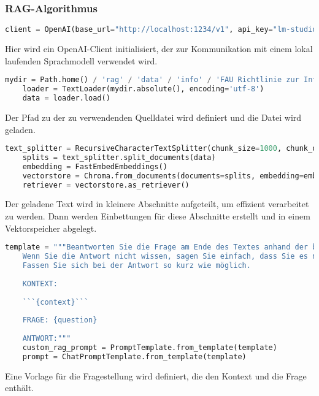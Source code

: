 \documentclass[german,report]{i1thesis}
\begin{document}
\subsubsection{RAG-Algorithmus}%
\label{subsec:rag-alg}

\begin{lstlisting}[language=Python]
    client = OpenAI(base_url="http://localhost:1234/v1", api_key="lm-studio")
    \end{lstlisting}
Hier wird ein OpenAI-Client initialisiert, der zur Kommunikation mit einem lokal laufenden Sprachmodell verwendet wird.


\begin{lstlisting}[language=Python]
    mydir = Path.home() / 'rag' / 'data' / 'info' / 'FAU Richtlinie zur Informationssicherheit v0.95.txt'
    loader = TextLoader(mydir.absolute(), encoding='utf-8')
    data = loader.load()
    \end{lstlisting}
Der Pfad zu der zu verwendenden Quelldatei wird definiert und die Datei wird geladen.


\begin{lstlisting}[language=Python]
    text_splitter = RecursiveCharacterTextSplitter(chunk_size=1000, chunk_overlap=200)
    splits = text_splitter.split_documents(data)
    embedding = FastEmbedEmbeddings()
    vectorstore = Chroma.from_documents(documents=splits, embedding=embedding)
    retriever = vectorstore.as_retriever()
    \end{lstlisting}
Der geladene Text wird in kleinere Abschnitte aufgeteilt, um effizient verarbeitet zu werden. Dann werden Einbettungen für diese Abschnitte erstellt und in einem Vektorspeicher abgelegt.


\begin{lstlisting}[language=Python]
    template = """Beantworten Sie die Frage am Ende des Textes anhand der bereitgestellten Informationen.
    Wenn Sie die Antwort nicht wissen, sagen Sie einfach, dass Sie es nicht wissen, versuchen Sie nicht, eine Antwort zu erfinden.
    Fassen Sie sich bei der Antwort so kurz wie möglich.
    
    KONTEXT:
    
    ```{context}```
    
    FRAGE: {question}
    
    ANTWORT:"""
    custom_rag_prompt = PromptTemplate.from_template(template)
    prompt = ChatPromptTemplate.from_template(template)
    \end{lstlisting}
Eine Vorlage für die Fragestellung wird definiert, die den Kontext und die Frage enthält.
\end{document}
